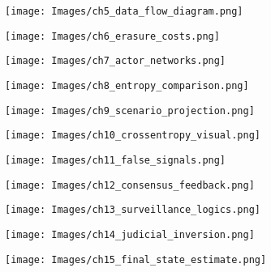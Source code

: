 \documentclass[12pt]{book}
\begin{document}

\texttt{[image: Images/ch5\_data\_flow\_diagram.png]}


\texttt{[image: Images/ch6\_erasure\_costs.png]}


\texttt{[image: Images/ch7\_actor\_networks.png]}


\texttt{[image: Images/ch8\_entropy\_comparison.png]}


\texttt{[image: Images/ch9\_scenario\_projection.png]}


\texttt{[image: Images/ch10\_crossentropy\_visual.png]}


\texttt{[image: Images/ch11\_false\_signals.png]}


\texttt{[image: Images/ch12\_consensus\_feedback.png]}


\texttt{[image: Images/ch13\_surveillance\_logics.png]}


\texttt{[image: Images/ch14\_judicial\_inversion.png]}


\texttt{[image: Images/ch15\_final\_state\_estimate.png]}

\appendix







\printbibliography
\end{document}
